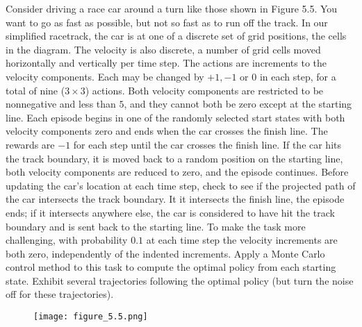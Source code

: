 
\begin{exercise}

Consider driving a race car around a turn like those shown in Figure 5.5.
You want to go as fast as possible, but not so fast as to run off the track.
In our simplified racetrack, the car is at one of a discrete set of grid
positions, the cells in the diagram. The velocity is also discrete, a
number of grid cells moved horizontally and vertically per time step.
The actions are increments to the velocity components. Each may be changed
by $+1,-1$ or $0$ in each step, for a total of nine ($3 \times 3$) actions.
Both velocity components are restricted to be nonnegative and less than $5$,
and they cannot both be zero except at the starting line. Each episode
begins in one of the randomly selected start states with both velocity
components zero and ends when the car crosses the finish line. The rewards
are $-1$ for each step until the car crosses the finish line. If the car
hits the track boundary, it is moved back to a random position on the starting line,
both velocity components are reduced to zero, and the episode continues.
Before updating the car's location at each time step, check to see if the
projected path of the car intersects the track boundary. It it intersects
the finish line, the episode ends; if it intersects anywhere else, the car
is considered to have hit the track boundary and is sent back to the starting line.
To make the task more challenging, with probability $0.1$ at each time step
the velocity increments are both zero, independently of the indented increments.
Apply a Monte Carlo control method to this task to compute the optimal policy from
each starting state. Exhibit several trajectories following the optimal
policy (but turn the noise off for these trajectories).

\begin{figure}[H]
  \centering
  \texttt{[image: figure\_5.5.png]}
\end{figure}

\end{exercise}


\begin{solution}

\phantom{}

\end{solution}

